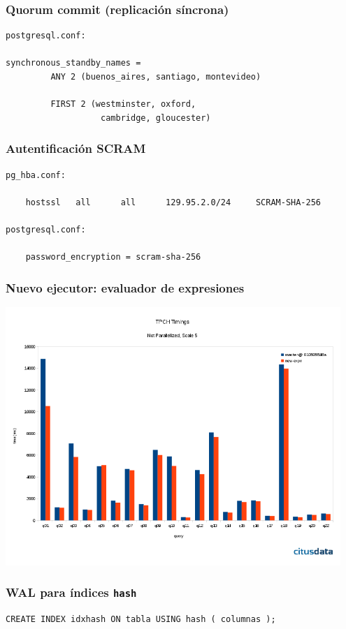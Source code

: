 \begin{frame}[fragile]
\frametitle{Quorum commit (replicación síncrona)}

\begin{lstlisting}
postgresql.conf:

synchronous_standby_names =
         ANY 2 (buenos_aires, santiago, montevideo)

         FIRST 2 (westminster, oxford,
                   cambridge, gloucester)
\end{lstlisting}
\end{frame}

\begin{frame}[fragile]
\frametitle{Autentificación SCRAM}

\begin{lstlisting}
pg_hba.conf:

    hostssl   all      all      129.95.2.0/24     SCRAM-SHA-256

postgresql.conf:

    password_encryption = scram-sha-256
\end{lstlisting}
\end{frame}

\begin{frame}[fragile]
\frametitle{Nuevo ejecutor: evaluador de expresiones}

\includegraphics[width=0.95\textwidth]{exec.png}
\end{frame}

\begin{frame}[fragile]
\frametitle{WAL para índices \texttt{hash}}

\begin{lstlisting}
CREATE INDEX idxhash ON tabla USING hash ( columnas );
\end{lstlisting}
\end{frame}

